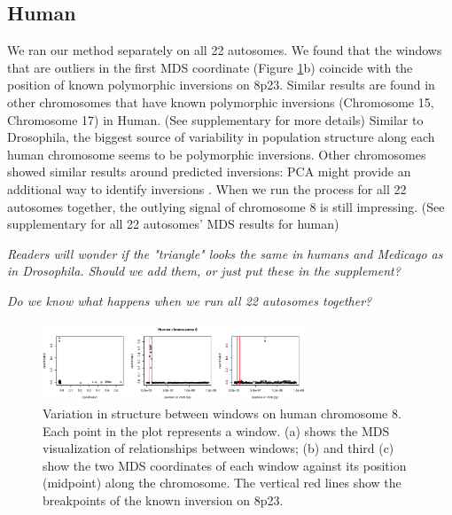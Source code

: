 \documentclass[11pt, oneside]{article}   	%
\newcommand{\plr}[1]{{\em \color{blue} #1}}
\begin{document}
\subsection{Human}
We ran our method separately on all 22 autosomes. 
We found that the windows that are outliers in the first MDS coordinate (Figure \ref{fig:mds_human}b) coincide with the position of known polymorphic inversions on 8p23. 
Similar results are found in other chromosomes that have known polymorphic inversions (Chromosome 15, Chromosome 17) in Human. (See supplementary for more details)
Similar to Drosophila, the biggest source of variability in population structure along each human chromosome seems to be polymorphic inversions. Other chromosomes showed similar results around predicted inversions: PCA might provide an additional way to identify inversions \citep{ma2012investigation}.
When we run the process for all 22 autosomes together, the outlying signal of chromosome 8 is still impressing. (See supplementary for all 22 autosomes' MDS results for human)

\plr{Readers will wonder if the "triangle" looks the same in humans and Medicago as in Drosophila. Should we add them, or just put these in the supplement?}

\plr{Do we know what happens when we run all 22 autosomes together?}

\begin{figure}
    \begin{center}
       \includegraphics[width=0.7\textwidth]{Fig4_POPRES_Together_MDS_plot_chr8_final_abline}
    \end{center}
    \caption{
         Variation in structure between windows on human chromosome 8. Each point in the plot represents a window. 
         (a) shows the MDS visualization of relationships between windows; 
         (b) and third (c) show the two MDS coordinates of each window against its position (midpoint) along the chromosome. 
         The vertical red lines show the breakpoints of the known inversion on 8p23. \citep{antonacci2009characterization}
        \label{fig:mds_human}
    }
\end{figure}
\end{document}
